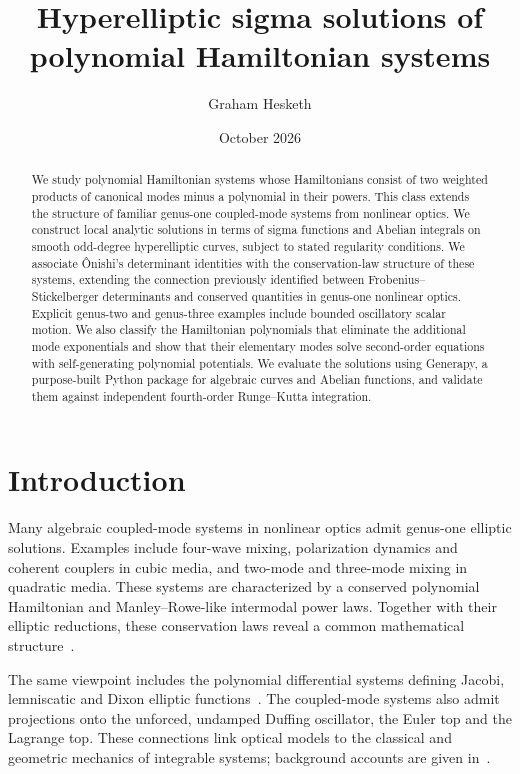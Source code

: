 \documentclass[11pt]{article}
\title{Hyperelliptic sigma solutions of polynomial Hamiltonian systems}
\author{Graham Hesketh}
\date{October 2026}
\begin{document}
\maketitle
\begin{abstract}
We study polynomial Hamiltonian systems whose Hamiltonians consist of two weighted products of canonical modes minus a polynomial in their powers. This class extends the structure of familiar genus-one coupled-mode systems from nonlinear optics. We construct local analytic solutions in terms of sigma functions and Abelian integrals on smooth odd-degree hyperelliptic curves, subject to stated regularity conditions. We associate \^Onishi's determinant identities with the conservation-law structure of these systems, extending the connection previously identified between Frobenius--Stickelberger determinants and conserved quantities in genus-one nonlinear optics. Explicit genus-two and genus-three examples include bounded oscillatory scalar motion. We also classify the Hamiltonian polynomials that eliminate the additional mode exponentials and show that their elementary modes solve second-order equations with self-generating polynomial potentials. We evaluate the solutions using Generapy, a purpose-built Python package for algebraic curves and Abelian functions, and validate them against independent fourth-order Runge--Kutta integration.
\end{abstract}

\section{Introduction}

Many algebraic coupled-mode systems in nonlinear optics admit genus-one elliptic solutions. Examples include four-wave mixing, polarization dynamics and coherent couplers in cubic media, and two-mode and three-mode mixing in quadratic media. These systems are characterized by a conserved polynomial Hamiltonian and Manley--Rowe-like intermodal power laws. Together with their elliptic reductions, these conservation laws reveal a common mathematical structure~\cite{agrawal,armstrong,jensen,stolen,chen-snyder,chen,envelopes,fourwave,coupler}.

The same viewpoint includes the polynomial differential systems defining Jacobi, lemniscatic and Dixon elliptic functions~\cite{dixon}. The coupled-mode systems also admit projections onto the unforced, undamped Duffing oscillator, the Euler top and the Lagrange top. These connections link optical models to the classical and geometric mechanics of integrable systems; background accounts are given in~\cite{holm,holm-rigid,whittaker-dynamics,mechanics,duffing}.
\end{document}
